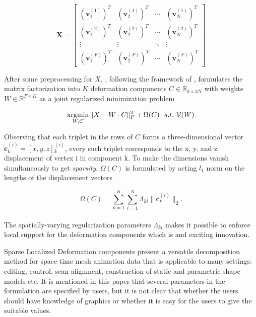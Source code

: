 \small{
\begin{equation}
 \label{eq:edgecotanoperator}
 \mathbf{X} = {\left[ \begin{array}{cccc}
 (\mathbf{v}{_1^{(1)}})^{T} & (\mathbf{v}{_2^{(1)}})^{T} & \cdots & (\mathbf{v}{_{N}^{(1)}})^{T}\\
 (\mathbf{v}{_1^{(2)}})^{T} & (\mathbf{v}{_2^{(2)}})^{T} & \cdots & (\mathbf{v}{_{N}^{(2)}})^{T}\\
 \vdots & \vdots & \ddots & \vdots\\
 (\mathbf{v}{_1^{(F)}})^{T} & (\mathbf{v}{_2^{(F)}})^{T} & \cdots & (\mathbf{v}{_{N}^{(F)}})^{T}
 \end{array}
 \right]}
\end{equation}
}

After some preprocessing for $X$, \cite{neumann2013sparse},
following the framework of \cite{zou2006sparse},
formulates the matrix factorization into $K$ deformation components $C\in \mathbb{R}_{k\times 3N}$ with weights
$W\in \mathbb{R}^{F\times K}$ as a joint regularized minimization problem

\small{
\begin{equation}
 \label{eq:sparselocal}
 \mathop{\operatorname*{argmin}}_{W,C}\|X-W\cdot C\|{_{F}^2}+\Omega(C)~~s.t.~\mathcal{V}(W)
\end{equation}
}

Observing that each triplet in the rows of $C$ forms a three-dimensional vector $\mathbf{c}{_{k}^{(i)}}=[x,y,z]{_{k}^{(i)}}$,
every such triplet corresponds to the x, y, and z displacement of vertex i in component k.
To make the dimensions vanish simultaneously to get \textit{sparsity}, $\Omega(C)$ is formulated by acting $l_1$ norm on the lengths of the displacement vectors

\small{
\begin{equation}
 \label{eq:sparselocal}
 \Omega(C)=\sum_{k=1}^{K}\sum_{i=1}^{N}\Lambda_{ki}\|\mathbf{c}{_{k}^{(i)}}\|_2.
\end{equation}
}
\\
The spatially-varying regularization parameters $\Lambda_{ki}$ makes it possible to enforce local support for the deformation components which is and exciting innovation.

Sparse Localized Deformation components present a versatile decomposition method for space-time mesh animation data that is applicable to many settings: editing, control, scan alignment, construction of static and parametric shape models etc.
It is mentioned in this paper that several parameters in the formulation are specified by users,
but it is not clear that whether the users should have knowledge of graphics or
whether it is easy for the users to give the suitable values.

